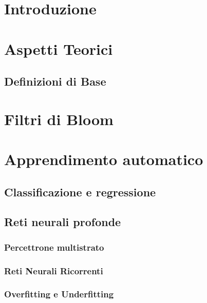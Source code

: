 \documentclass[4apaper,11pt]{report}
\begin{document}
\tableofcontents

\chapter{Introduzione}

\chapter{Aspetti Teorici}
\section{Definizioni di Base}

\chapter{Filtri di Bloom}
\label{chap:FiltriBloom}

\chapter{Apprendimento automatico}
\label{chap:ApprendimentoAutomatico}

\section{Classificazione e regressione}

\section{Reti neurali profonde} %

\subsection{Percettrone multistrato}

\subsection{Reti Neurali Ricorrenti}
\label{sec:retiRicorrenti}

\subsection{Overfitting e Underfitting}
\label{sec:overfitting}

\end{document}
